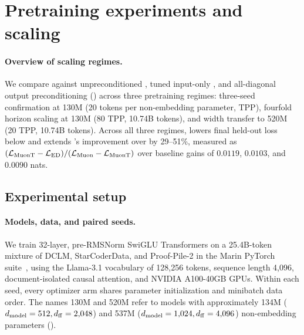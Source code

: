\section{Pretraining experiments and scaling}
\label{sec:scaling}

\paragraph{Overview of scaling regimes.}
We compare  against unpreconditioned , tuned input-only , and all-diagonal output preconditioning () across three pretraining regimes: three-seed confirmation at 130M (20 tokens per non-embedding parameter, TPP), fourfold horizon scaling at 130M (80 TPP, 10.74B tokens), and width transfer to 520M (20 TPP, 10.74B tokens). Across all three regimes,  lowers final held-out loss below  and extends 's improvement over  by 29--51\%, measured as $(\mathcal L_{\rm MuonT}-\mathcal L_{\rm ED})/(\mathcal L_{\rm Muon}-\mathcal L_{\rm MuonT})$ over baseline gains of $0.0119$, $0.0103$, and $0.0090$ nats.

\subsection{Experimental setup}
\label{sec:testbed}

\paragraph{Models, data, and paired seeds.}
We train 32-layer, pre-RMSNorm SwiGLU Transformers on a 25.4B-token mixture of DCLM, StarCoderData, and Proof-Pile-2 in the Marin PyTorch suite~\citep{mohamadi2026toner}, using the Llama-3.1 vocabulary of 128,256 tokens, sequence length 4,096, document-isolated causal attention, and NVIDIA A100-40GB GPUs. Within each seed, every optimizer arm shares parameter initialization and minibatch data order. The names 130M and 520M refer to models with approximately 134M ($d_{\mathrm{model}}=512,d_{\mathrm{ff}}=2{,}048$) and 537M ($d_{\mathrm{model}}=1{,}024,d_{\mathrm{ff}}=4{,}096$) non-embedding parameters ().

\suppressfloats[t]


